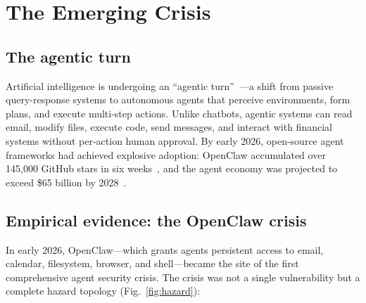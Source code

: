 \documentclass[pdflatex,sn-nature]{sn-jnl}%
\theoremstyle{thmstyleone}%
\theoremstyle{thmstyletwo}%
\theoremstyle{thmstylethree}%
\begin{document}
\section{The Emerging Crisis}\label{sec:crisis}

\subsection{The agentic turn}\label{subsec:agentic-turn}

Artificial intelligence is undergoing an ``agentic turn''~\cite{gabriel2025ethics}---a shift from passive query-response systems to autonomous agents that perceive environments, form plans, and execute multi-step actions. Unlike chatbots, agentic systems can read email, modify files, execute code, send messages, and interact with financial systems without per-action human approval. By early 2026, open-source agent frameworks had achieved explosive adoption: OpenClaw accumulated over 145,000 GitHub stars in six weeks~\cite{openclaw2026advisories}, and the agent economy was projected to exceed \$65 billion by 2028~\cite{mam2025aiagents}.

\subsection{Empirical evidence: the OpenClaw crisis}\label{subsec:openclaw}

In early 2026, OpenClaw---which grants agents persistent access to email, calendar, filesystem, browser, and shell---became the site of the first comprehensive agent security crisis. The crisis was not a single vulnerability but a complete hazard topology (Fig.~\ref{fig:hazard}):
\end{document}
